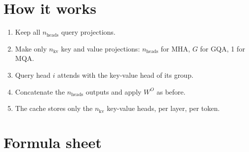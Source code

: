 \section{How it works}
\begin{enumerate}
  \item Keep all $n_{\text{heads}}$ query projections.
  \item Make only $n_{\text{kv}}$ key and value projections: $n_{\text{heads}}$ for MHA, $G$ for GQA, 1 for MQA.
  \item Query head $i$ attends with the key-value head of its group.
  \item Concatenate the $n_{\text{heads}}$ outputs and apply $W^O$ as before.
  \item The cache stores only the $n_{\text{kv}}$ key-value heads, per layer, per token.
\end{enumerate}

\section*{Formula sheet}

